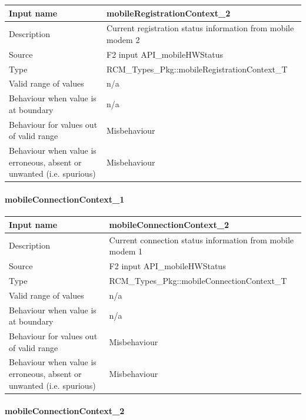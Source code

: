 \begin{longtable}{p{}p{}}
	\toprule
	Input name				& mobileRegistrationContext\_2 \\
	\midrule
	Description				& Current registration status information from mobile modem 2 \\
	\midrule
	Source					& F2 input API\_mobileHWStatus \\ 
	\midrule
	Type					& RCM\_Types\_Pkg::mobileRegistrationContext\_T \\
	\midrule
	Valid range of values	& n/a \\
	\midrule
	Behaviour when value is at boundary	& n/a \\
	\midrule
	Behaviour for values out of valid range	& Misbehaviour \\
	\midrule
	Behaviour when value is erroneous, absent or unwanted (i.e. spurious) & Misbehaviour \\
	\bottomrule
\end{longtable}

\paragraph{mobileConnectionContext\_1}

\begin{longtable}{p{}p{}}
	\toprule
	Input name				& mobileConnectionContext\_2 \\
	\midrule
	Description				& Current connection status information from mobile modem 1 \\
	\midrule
	Source					& F2 input API\_mobileHWStatus \\ 
	\midrule
	Type					& RCM\_Types\_Pkg::mobileConnectionContext\_T \\
	\midrule
	Valid range of values	& n/a \\
	\midrule
	Behaviour when value is at boundary	& n/a \\
	\midrule
	Behaviour for values out of valid range	& Misbehaviour \\
	\midrule
	Behaviour when value is erroneous, absent or unwanted (i.e. spurious) & Misbehaviour \\
	\bottomrule
\end{longtable}

\paragraph{mobileConnectionContext\_2}


